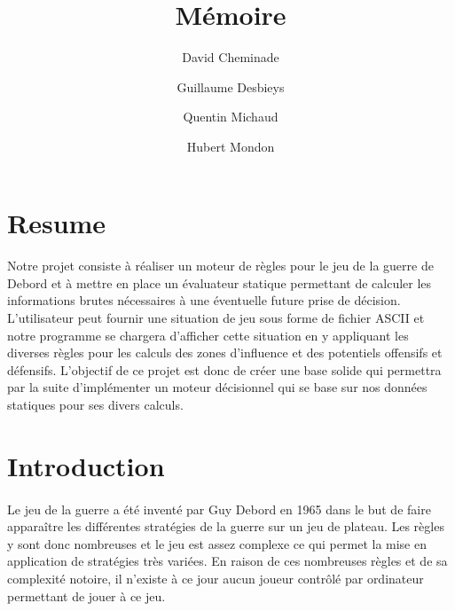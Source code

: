 \documentclass[12pt]{article}
\begin{document}
 
	\title{Mémoire}             
	\author{
		David Cheminade
		\and
		Guillaume Desbieys
		\and
		Quentin Michaud
		\and
		Hubert Mondon
	}                       
	\date{}
	\maketitle{}                

	\let\thefootnote\relax

	\clearpage
	\clearpage
	
	\section*{Resume}
	
	\paragraph{}
	Notre projet consiste à réaliser un moteur de règles pour le jeu de la guerre de Debord et à mettre en place un 
	évaluateur statique permettant de calculer les informations brutes nécessaires à une éventuelle future prise de décision.
	L'utilisateur peut fournir une situation de jeu sous forme de fichier ASCII et notre programme se chargera d'afficher 
	cette situation en y appliquant les diverses règles pour les calculs des zones d'influence et des potentiels offensifs et défensifs.
	L'objectif de ce projet est donc de créer une base solide qui permettra par la suite d'implémenter un moteur 
	décisionnel qui se base sur nos données statiques pour ses divers calculs.
	
	
	\clearpage
	
	\tableofcontents
	
	\clearpage

	\section{Introduction}
	
	\paragraph{}
	Le jeu de la guerre a été inventé par Guy Debord en 1965 dans le but de faire apparaître les différentes stratégies de la guerre sur un jeu de plateau. 
	Les règles y sont donc nombreuses et le jeu est assez complexe ce qui permet la mise en application de stratégies très variées.
	En raison de ces nombreuses règles et de sa complexité notoire, il n'existe à ce jour aucun joueur contrôlé par ordinateur permettant de jouer à ce jeu.
	
\end{document}
